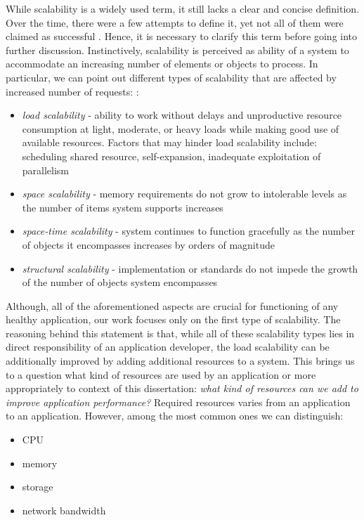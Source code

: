 While scalability is a widely used term, it still lacks a clear and concise definition. Over the time, there were a few attempts to define it, yet not all of them were claimed as successful \cite{Hi90} \cite{DuRoWi06}. Hence, it is necessary to clarify this term before going into further discussion. Instinctively, scalability is perceived as ability of a system to accommodate an increasing number of elements or objects to process. In particular, we can point out different types of scalability that are affected by increased number of requests: \cite{Bo00}:
\begin{itemize}
	\item \textit{load scalability} - ability to work without delays and unproductive resource consumption at light, moderate, or heavy loads while making good use of available resources. Factors that may hinder load scalability include: scheduling shared resource, self-expansion, inadequate exploitation of parallelism
	\item \textit{space scalability} - memory requirements do not grow to intolerable levels as the number of items system supports increases
	\item \textit{space-time scalability} - system continues to function gracefully as the number of objects it encompasses increases by orders of magnitude
	\item \textit{structural scalability} - implementation or standards do not impede the growth of the number of objects system encompasses
\end{itemize}
Although, all of the aforementioned aspects are crucial for functioning of any healthy application, our work focuses only on the first type of scalability. The reasoning behind this statement is that, while all of these scalability types lies in direct responsibility of an application developer, the load scalability can be additionally improved by adding additional resources to a system. This brings us to a question what kind of resources are used by an application or more appropriately to context of this dissertation: \textit{what kind of resources can we add to improve application performance?} Required resources varies from an application to an application. However, among the most common ones we can distinguish:
\begin{itemize}
	\item CPU
	\item memory
	\item storage
	\item network bandwidth
\end{itemize}

